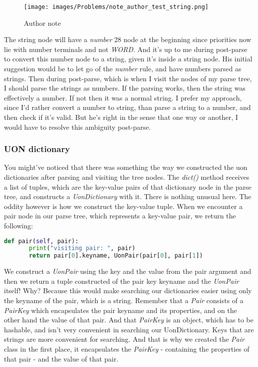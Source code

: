 \documentclass[12pt]{article}
\begin{document}
\begin{figure}[ht!]
 	\centering
 	\caption{Author note}
 	\texttt{[image: images/Problems/note\_author\_test\_string.png]}
 	\label{fig:author note}
\end{figure}

The string node will have a \emph{number} 28 node at the beginning since priorities now lie with number terminals and not \emph{WORD}. And it’s up to me during post-parse to convert this number node to a string, given it’s inside a string node.
His initial suggestion would be to let go of the \emph{number} rule, and have numbers parsed as strings. Then during post-parse, which is when I visit the nodes of my parse tree, I should parse the strings as numbers. If the parsing works, then the string was effectively a number. If not then it was a normal string. 
I prefer my approach, since I’d rather convert a number to string, than parse a string to a number, and then check if it’s valid. But he’s right in the sense that one way or another, I would have to resolve this ambiguity post-parse.


\subsubsection{UON dictionary}
You might’ve noticed that there was something the way we constructed the uon dictionaries after parsing and visiting the tree nodes. The \emph{dict()} method receives a list of tuples, which are the key-value pairs of that dictionary node in the parse tree, and constructs a \emph{UonDictionary} with it. There is nothing unusual here. The oddity however is how we construct the key-value tuple. When we encounter a pair node in our parse tree, which represents a key-value pair, we return the following:

\begin{lstlisting}[language=Python]
def pair(self, pair):
       print("visiting pair: ", pair)
       return pair[0].keyname, UonPair(pair[0], pair[1])
\end{lstlisting}

We construct a \emph{UonPair} using the key and the value from the pair argument and then we return a tuple constructed of the pair key keyname and the \emph{UonPair} itself! Why? Because this would make searching our dictionaries easier using only the keyname of the pair, which is a string. Remember that a \emph{Pair} consists of a \emph{PairKey} which encapsulates the pair keyname and its properties, and on the other hand the value of that pair. And that \emph{PairKey} is an object, which has to be hashable, and isn’t very convenient in searching our UonDictionary. Keys that are strings are more convenient for searching. And that is why we created the \emph{Pair} class in the first place, it encapsulates the \emph{PairKey} - containing the properties of that pair -  and the value of that pair. 
\end{document}

